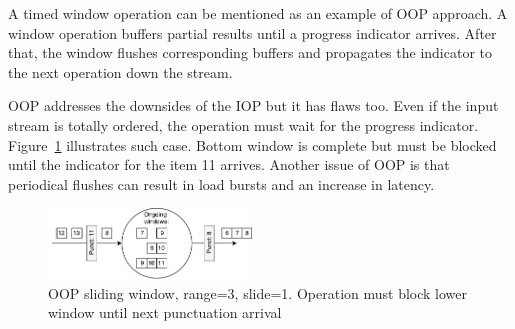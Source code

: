 A timed window operation can be mentioned as an example of OOP approach. A window operation buffers partial results until a progress indicator arrives. After that, the window flushes corresponding buffers and propagates the indicator to the next operation down the stream.

OOP addresses the downsides of the IOP but it has flaws too. Even if the input stream is totally ordered, the operation must wait for the progress indicator. Figure~\ref{oop} illustrates such case. Bottom window is complete but must be blocked until the indicator for the item 11 arrives. Another issue of OOP is that periodical flushes can result in load bursts and an increase in latency. 

\begin{figure}[htbp]
  \centering
  \includegraphics[width=0.48\textwidth]{pics/oop}
  \caption{OOP sliding window, range=3, slide=1. Operation must block lower window until next punctuation arrival }
  \label {oop}
\end{figure}

